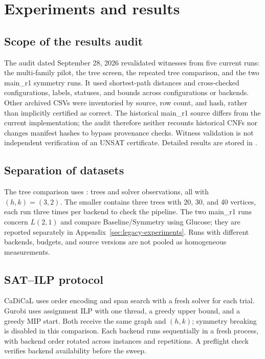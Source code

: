 \section{Experiments and results}
\subsection{Scope of the results audit}
The audit dated September 28, 2026 revalidated witnesses from five current
runs: the multi-family pilot, the tree screen, the repeated tree comparison,
and the two main\_r1 symmetry runs. It used shortest-path distances and
cross-checked configurations, labels, statuses, and bounds across configurations
or backends. Other archived CSVs were inventoried by source, row count, and
hash, rather than implicitly certified as correct. The historical main\_r1
source differs from the current implementation; the audit therefore neither
recounts historical CNFs nor changes manifest hashes to bypass provenance
checks. Witness validation is not independent verification of an UNSAT certificate.
Detailed results are stored in .

\subsection{Separation of datasets}
The tree comparison uses :
\TreeGraphCount{} trees and \TreeObservationCount{} solver observations,
all with $(h,k)=(3,2)$. The smaller  contains
three trees with 20, 30, and 40 vertices, each run three times per backend
to check the pipeline. The two main\_r1 runs concern $L(2,1)$ and compare
Baseline/Symmetry using Glucose; they are reported separately in
Appendix~\ref{sec:legacy-experiments}. Runs with different backends, budgets,
and source versions are not pooled as homogeneous measurements.

\subsection{SAT--ILP protocol}
CaDiCaL uses order encoding and span search with a fresh solver for each
trial. Gurobi uses assignment ILP with one thread, a greedy upper bound,
and a greedy MIP start. Both receive the same graph and $(h,k)$; symmetry
breaking is disabled in this comparison. Each backend runs sequentially
in a fresh process, with backend order rotated across instances and
repetitions. A preflight check verifies backend availability before the sweep.

